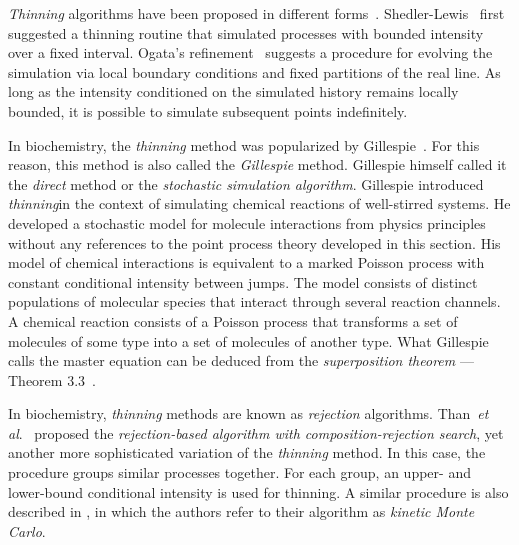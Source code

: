 \documentclass{juliacon}
\numberwithin{equation}{section}
\newcommand{\etal}{\textit{et al}.}
\begin{document}
\textit{Thinning} algorithms have been proposed in different forms~\cite{daley2003}. Shedler-Lewis~\cite{lewis1979} first suggested a thinning routine that simulated processes with bounded intensity over a fixed interval. Ogata's refinement~\cite{ogata1981} suggests a procedure for evolving the simulation via local boundary conditions and fixed partitions of the real line. As long as the intensity conditioned on the simulated history remains locally bounded, it is possible to simulate subsequent points indefinitely.

In biochemistry, the \textit{thinning} method was popularized by Gillespie~\cite{gillespie1976,gillespie1977}. For this reason, this method is also called the \textit{Gillespie} method. Gillespie himself called it the \textit{direct} method or the \textit{stochastic simulation algorithm}. Gillespie introduced \textit{thinning}in the context of simulating chemical reactions of well-stirred systems. He developed a stochastic model for molecule interactions from physics principles without any references to the point process theory developed in this section. His model of chemical interactions is equivalent to a marked Poisson process with constant conditional intensity between jumps. The model consists of distinct populations of molecular species that interact through several reaction channels. A chemical reaction consists of a Poisson process that transforms a set of molecules of some type into a set of molecules of another type. What Gillespie calls the master equation can be deduced from the \textit{superposition theorem} --- Theorem 3.3~\cite{last2017}.

In biochemistry, \textit{thinning} methods are known as \textit{rejection} algorithms. Than~\etal~\cite{thanh2014,thanh2017} proposed the \textit{rejection-based algorithm with composition-rejection search}, yet another more sophisticated variation of the \textit{thinning} method. In this case, the procedure groups similar processes together. For each group, an upper- and lower-bound conditional intensity is used for thinning. A similar procedure is also described in \cite{slepoy2008}, in which the authors refer to their algorithm as \textit{kinetic Monte Carlo}.
\end{document}
